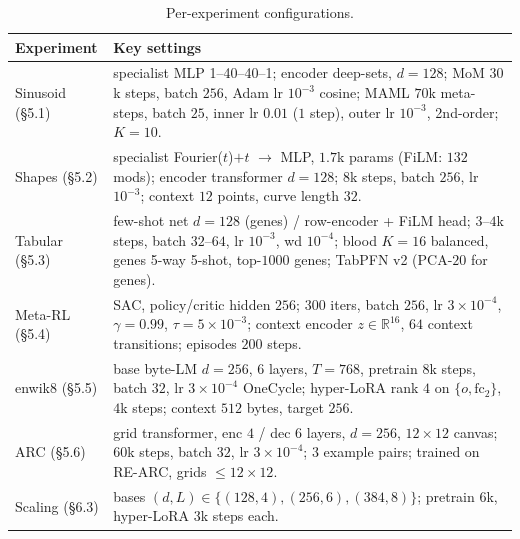 \documentclass[11pt]{article}
\begin{document}
\begin{table}[h]\centering\small
\setlength{\tabcolsep}{4pt}
\begin{tabular}{lp{}}
\toprule
Experiment & Key settings \\
\midrule
Sinusoid (\S5.1) & specialist MLP 1--40--40--1; encoder deep-sets, $d{=}128$; MoM
  $30$k steps, batch $256$, Adam lr $10^{-3}$ cosine; MAML $70$k meta-steps, batch
  $25$, inner lr $0.01$ ($1$ step), outer lr $10^{-3}$, 2nd-order; $K{=}10$. \\
Shapes (\S5.2) & specialist Fourier($t$)$+t$ $\to$ MLP, $1.7$k params (FiLM:
  $132$ mods); encoder transformer $d{=}128$; $8$k steps, batch $256$, lr $10^{-3}$;
  context $12$ points, curve length $32$. \\
Tabular (\S5.3) & few-shot net $d{=}128$ (genes) / row-encoder + FiLM head; $3$--$4$k
  steps, batch $32$--$64$, lr $10^{-3}$, wd $10^{-4}$; blood $K{=}16$ balanced,
  genes 5-way 5-shot, top-$1000$ genes; TabPFN v2 (PCA-$20$ for genes). \\
Meta-RL (\S5.4) & SAC, policy/critic hidden $256$; $300$ iters, batch $256$, lr
  $3{\times}10^{-4}$, $\gamma{=}0.99$, $\tau{=}5{\times}10^{-3}$; context encoder
  $z{\in}\mathbb{R}^{16}$, $64$ context transitions; episodes $200$ steps. \\
enwik8 (\S5.5) & base byte-LM $d{=}256$, $6$ layers, $T{=}768$, pretrain $8$k steps,
  batch $32$, lr $3{\times}10^{-4}$ OneCycle; hyper-LoRA rank $4$ on
  $\{o,\text{fc}_2\}$, $4$k steps; context $512$ bytes, target $256$. \\
ARC (\S5.6) & grid transformer, enc $4$ / dec $6$ layers, $d{=}256$, $12{\times}12$
  canvas; $60$k steps, batch $32$, lr $3{\times}10^{-4}$; $3$ example pairs; trained
  on RE-ARC, grids $\le 12{\times}12$. \\
Scaling (\S6.3) & bases $(d,L)\in\{(128,4),(256,6),(384,8)\}$; pretrain $6$k,
  hyper-LoRA $3$k steps each. \\
\bottomrule
\end{tabular}
\caption{Per-experiment configurations.}
\label{tab:hparams}
\end{table}



\end{document}
